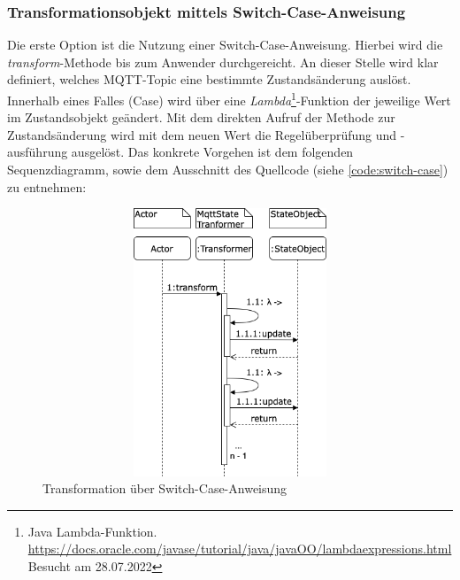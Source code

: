     \subsubsection*{Transformationsobjekt mittels Switch-Case-Anweisung}
    Die erste Option ist die Nutzung einer Switch-Case-Anweisung. Hierbei wird die \textit{transform}-Methode bis zum Anwender durchgereicht. An dieser Stelle 
    wird klar definiert, welches \acs{MQTT}-Topic eine bestimmte Zustandsänderung auslöst. Innerhalb eines Falles (Case) wird über eine 
    \textit{Lambda}\footnote{Java Lambda-Funktion. \url{https://docs.oracle.com/javase/tutorial/java/javaOO/lambdaexpressions.html} Besucht am 28.07.2022}-Funktion 
    der jeweilige Wert im Zustandsobjekt geändert. Mit dem direkten Aufruf der Methode zur Zustandsänderung wird mit dem neuen Wert die Regelüberprüfung und -ausführung 
    ausgelöst. Das konkrete Vorgehen ist dem folgenden Sequenzdiagramm, sowie dem Ausschnitt des Quellcode (siehe \ref{code:switch-case}) zu entnehmen:
    \begin{figure}[hbt!]
        \centering
        \includegraphics[width=14cm,height=8cm,keepaspectratio]{images/Transformation_old.png}
        \caption{Transformation über Switch-Case-Anweisung}
        \label{fig:sequenceTransformationOld}
    \end{figure}

